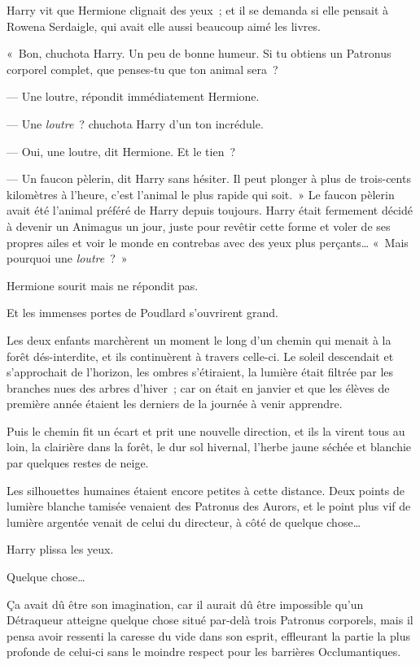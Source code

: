 Harry vit que Hermione clignait des yeux~; et il se demanda si elle pensait à Rowena Serdaigle, qui avait elle aussi beaucoup aimé les livres.

«~Bon, chuchota Harry. Un peu de bonne humeur. Si tu obtiens un Patronus corporel complet, que penses-tu que ton animal sera~?

--- Une loutre, répondit immédiatement Hermione.

--- Une \emph{loutre}~? chuchota Harry d'un ton incrédule.

--- Oui, une loutre, dit Hermione. Et le tien~?

--- Un faucon pèlerin, dit Harry sans hésiter. Il peut plonger à plus de trois-cents kilomètres à l'heure, c'est l'animal le plus rapide qui soit.~» Le faucon pèlerin avait été l'animal préféré de Harry depuis toujours. Harry était fermement décidé à devenir un Animagus un jour, juste pour revêtir cette forme et voler de ses propres ailes et voir le monde en contrebas avec des yeux plus perçants… «~Mais pourquoi une \emph{loutre}~?~»

Hermione sourit mais ne répondit pas.

Et les immenses portes de Poudlard s'ouvrirent grand.

Les deux enfants marchèrent un moment le long d'un chemin qui menait à la forêt dés-interdite, et ils continuèrent à travers celle-ci. Le soleil descendait et s'approchait de l'horizon, les ombres s'étiraient, la lumière était filtrée par les branches nues des arbres d'hiver~; car on était en janvier et que les élèves de première année étaient les derniers de la journée à venir apprendre.

Puis le chemin fit un écart et prit une nouvelle direction, et ils la virent tous au loin, la clairière dans la forêt, le dur sol hivernal, l'herbe jaune séchée et blanchie par quelques restes de neige.

Les silhouettes humaines étaient encore petites à cette distance. Deux points de lumière blanche tamisée venaient des Patronus des Aurors, et le point plus vif de lumière argentée venait de celui du directeur, à côté de quelque chose…

Harry plissa les yeux.

Quelque chose…

Ça avait dû être son imagination, car il aurait dû être impossible qu'un Détraqueur atteigne quelque chose situé par-delà trois Patronus corporels, mais il pensa avoir ressenti la caresse du vide dans son esprit, effleurant la partie la plus profonde de celui-ci sans le moindre respect pour les barrières Occlumantiques.

